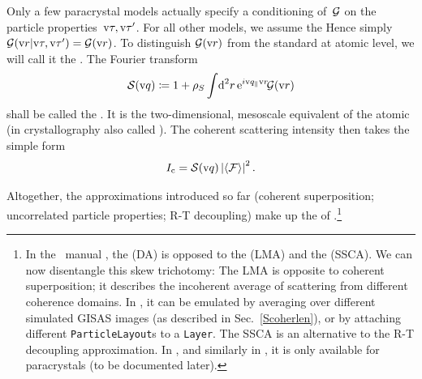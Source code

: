 Only a few paracrystal models actually specify
a conditioning of~$\mathcal{G}$ on the particle properties~$\text{v}\tau,\text{v}\tau'$.
For all other models, we assume the
Hence simply $\mathcal{G}(\text{v}{r}|\text{v}\tau,\text{v}\tau')=\mathcal{G}(\text{v}{r})$.
To distinguish $\mathcal{G}(\text{v}{r})$ from the standard 
%
at atomic level, we will call it the
.
%
The Fourier transform
\begin{equation}
  \mathcal{S}(\text{v}{q})\coloneqq 1 + \rho_S \int\!\text{d}^2r\,   \text{e}^{i\text{v}{q}_{\parallel}\text{v}{r}}\!   \mathcal{G}(\text{v}{r})
\end{equation}
shall be called the .
It is the two-dimensional, mesoscale equivalent of
the atomic 
%
(in crystallography also called ).
%
The coherent scattering intensity then takes the simple form
\Emph
{\begin{equation}
  I_\text{c} = \mathcal{S}(\text{v}{q}) \left|\left\langle\mathcal{F}\right\rangle\right|^2.
\end{equation}\vskip -5pt}

Altogether, the approximations introduced so far
(coherent superposition; uncorrelated particle properties;
R-T decoupling)
make up the 
of \IsGISAXS.\footnote
{In the \IsGISAXS\ manual \cite[Sec.~2.2]{Laz08},
the  (DA)
%
%
is opposed to the
 (LMA)
%
%
and the
 (SSCA).
%
%
We can now disentangle this skew trichotomy:
The LMA is opposite to coherent superposition;
it describes the incoherent average of
scattering from different coherence domains.
In \BornAgain,
it can be emulated by averaging over different simulated GISAS images
(as described in Sec.~\ref{Scoherlen}),
or by attaching different \texttt{ParticleLayout}s to a \texttt{Layer}.
The SSCA is an alternative to the R-T decoupling approximation.
In \IsGISAXS, and similarly in \BornAgain,
it is only available for paracrystals
(to be documented later).
}

